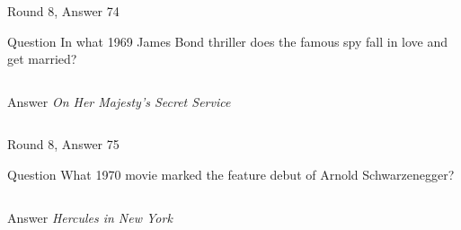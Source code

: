 \documentclass[11pt]{beamer}
\begin{document}
\begin{frame}[t]{Round 8, Answer 74}
  \vspace{2em}
  \begin{block}{Question}
    In what 1969 James Bond thriller does the famous spy fall in love and get married?
  \end{block}
  \pause{}
  \begin{columns}[T,totalwidth=\linewidth]
    \begin{column}{0.35\linewidth}
      \begin{block}{Answer}
        \emph{On Her Majesty's Secret Service}
      \end{block}
    \end{column}
    \begin{column}{0.6\linewidth}
      \begin{center}
        \texttt{[image: \{Images/onhermajesty]}.jpg}
      \end{center}
    \end{column}
  \end{columns}
\end{frame}


\begin{frame}[t]{Round 8, Answer 75}
  \vspace{2em}
  \begin{block}{Question}
    What 1970 movie marked the feature debut of Arnold Schwarzenegger?
  \end{block}
  \pause{}
  \begin{columns}[T,totalwidth=\linewidth]
    \begin{column}{0.35\linewidth}
      \begin{block}{Answer}
        \emph{Hercules in New York}
      \end{block}
    \end{column}
    \begin{column}{0.6\linewidth}
      \begin{center}
        \texttt{[image: \{Images/hercules1]}.jpg}
      \end{center}
    \end{column}
  \end{columns}
\end{frame}
\end{document}
